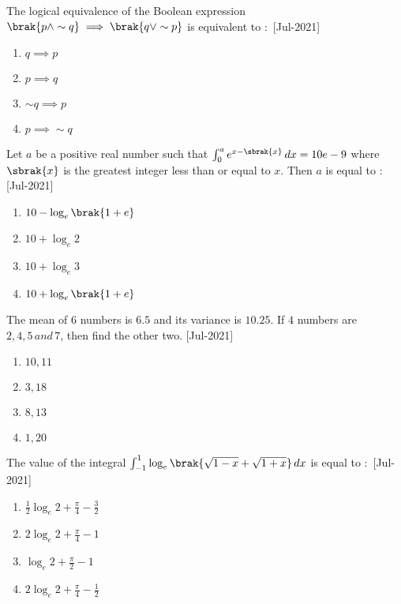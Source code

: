  \iffalse
    \title{2021}
    \author{EE24BTECH11021}
    \section{mcq-single}
\fi
    \item The logical equivalence of the Boolean expression $\brak{p\wedge\sim q}\implies \brak{q\vee \sim p}$ is equivalent to $\colon$
    \hfill{[Jul-2021]}
        \begin{enumerate}
            \item $q\implies p$
            \item $p\implies q$
            \item $\sim q\implies p$
            \item $p\implies \sim q$
        \end{enumerate}
    \item Let $a$ be a positive real number such that $\int_{0}^{a}e^{x-\sbrak{x}} \, dx=10e-9$ where $\sbrak{x}$ is the greatest integer less than or equal to $x$. Then $a$ is equal to $\colon$
    \hfill{[Jul-2021]}
        \begin{enumerate}
            \item $10-\log_{e}\brak{1+e}$
            \item $10+\log_{e}2$
            \item $10+\log_{e}3$
            \item $10+\log_{e}\brak{1+e}$
        \end{enumerate}
    \item The mean of $6$ numbers is $6.5$ and its variance is $10.25$. If $4$ numbers are $2,4,5\, and\, 7$, then find the other two.
    \hfill{[Jul-2021]}
        \begin{enumerate}
            \item $10,11$
            \item $3,18$
            \item $8,13$
            \item $1,20$
        \end{enumerate}
    \item The value of the integral $\int_{-1}^{1}\log_{e}\brak{\sqrt{1-x}+\sqrt{1+x}} \, dx$ is equal to $\colon$
    \hfill{[Jul-2021]}
        \begin{enumerate}
            \item $\frac{1}{2}\log_{e}2+\frac{\pi}{4}-\frac{3}{2}$
            \item $2\log_{e}2+\frac{\pi}{4}-1$
            \item $\log_{e}2+\frac{\pi}{2}-1$
            \item $2\log_{e}2+\frac{\pi}{4}-\frac{1}{2}$
        \end{enumerate}
